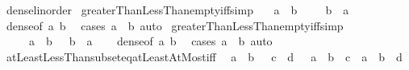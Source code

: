 \begin{isabellebody}
\isamarkupfalse%
\ dense{\isacharunderscore}{\kern0pt}linorder\isanewline
{}\isanewline
\isanewline
{}\isamarkupfalse%
\ greaterThanLessThan{\isacharunderscore}{\kern0pt}empty{\isacharunderscore}{\kern0pt}iff{\isacharbrackleft}{\kern0pt}simp{\isacharbrackright}{\kern0pt}{\isacharcolon}{\kern0pt}\isanewline
\ \ {\isachardoublequoteopen}{\isacharbraceleft}{\kern0pt}\ a\ {\isacharless}{\kern0pt}{\isachardot}{\kern0pt}{\isachardot}{\kern0pt}{\isacharless}{\kern0pt}\ b\ {\isacharbraceright}{\kern0pt}\ {\isacharequal}{\kern0pt}\ {\isacharbraceleft}{\kern0pt}{\isacharbraceright}{\kern0pt}\ {\isasymlongleftrightarrow}\ b\ {\isasymle}\ a{\isachardoublequoteclose}\isanewline
%
\isadelimproof
\ \ %
\endisadelimproof
%
\isatagproof
{}\isamarkupfalse%
\ dense{\isacharbrackleft}{\kern0pt}of\ a\ b{\isacharbrackright}{\kern0pt}\ \isamarkupfalse%
\ {\isacharparenleft}{\kern0pt}cases\ {\isachardoublequoteopen}a\ {\isacharless}{\kern0pt}\ b{\isachardoublequoteclose}{\isacharparenright}{\kern0pt}\ auto%
\endisatagproof
{\isafoldproof}%
%
\isadelimproof
\isanewline
%
\endisadelimproof
\isanewline
{}\isamarkupfalse%
\ greaterThanLessThan{\isacharunderscore}{\kern0pt}empty{\isacharunderscore}{\kern0pt}iff{}{\isacharbrackleft}{\kern0pt}simp{\isacharbrackright}{\kern0pt}{\isacharcolon}{\kern0pt}\isanewline
\ \ {\isachardoublequoteopen}{\isacharbraceleft}{\kern0pt}{\isacharbraceright}{\kern0pt}\ {\isacharequal}{\kern0pt}\ {\isacharbraceleft}{\kern0pt}\ a\ {\isacharless}{\kern0pt}{\isachardot}{\kern0pt}{\isachardot}{\kern0pt}{\isacharless}{\kern0pt}\ b\ {\isacharbraceright}{\kern0pt}\ {\isasymlongleftrightarrow}\ b\ {\isasymle}\ a{\isachardoublequoteclose}\isanewline
%
\isadelimproof
\ \ %
\endisadelimproof
%
\isatagproof
{}\isamarkupfalse%
\ dense{\isacharbrackleft}{\kern0pt}of\ a\ b{\isacharbrackright}{\kern0pt}\ \isamarkupfalse%
\ {\isacharparenleft}{\kern0pt}cases\ {\isachardoublequoteopen}a\ {\isacharless}{\kern0pt}\ b{\isachardoublequoteclose}{\isacharparenright}{\kern0pt}\ auto%
\endisatagproof
{\isafoldproof}%
%
\isadelimproof
\isanewline
%
\endisadelimproof
\isanewline
{}\isamarkupfalse%
\ atLeastLessThan{\isacharunderscore}{\kern0pt}subseteq{\isacharunderscore}{\kern0pt}atLeastAtMost{\isacharunderscore}{\kern0pt}iff{\isacharcolon}{\kern0pt}\isanewline
\ \ {\isachardoublequoteopen}{\isacharbraceleft}{\kern0pt}a\ {\isachardot}{\kern0pt}{\isachardot}{\kern0pt}{\isacharless}{\kern0pt}\ b{\isacharbraceright}{\kern0pt}\ {\isasymsubseteq}\ {\isacharbraceleft}{\kern0pt}\ c\ {\isachardot}{\kern0pt}{\isachardot}{\kern0pt}\ d\ {\isacharbraceright}{\kern0pt}\ {\isasymlongleftrightarrow}\ {\isacharparenleft}{\kern0pt}a\ {\isacharless}{\kern0pt}\ b\ {\isasymlongrightarrow}\ c\ {\isasymle}\ a\ {\isasymand}\ b\ {\isasymle}\ d{\isacharparenright}{\kern0pt}{\isachardoublequoteclose}\isanewline

\end{isabellebody}
